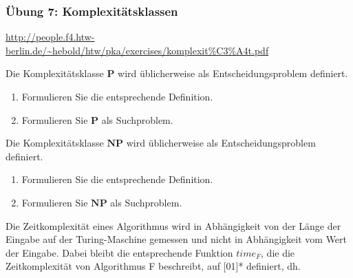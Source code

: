 \begin{card}
	\frametitle{Übung 7: Komplexitätsklassen}
	\url{http://people.f4.htw-berlin.de/~hebold/htw/pka/exercises/komplexit\%C3\%A4t.pdf}
\end{card}

\begin{card}
	Die Komplexitätsklasse $\mathbf{P}$ wird üblicherweise als Entscheidungsproblem definiert.
	\begin{enumerate}
	\item Formulieren Sie die entsprechende Definition.
	\item Formulieren Sie $\mathbf{P}$ als Suchproblem. 
	\end{enumerate}
	\hr
\end{card}

\begin{card}
	Die Komplexitätsklasse $\mathbf{NP}$ wird üblicherweise als Entscheidungsproblem definiert.
	\begin{enumerate}
	\item Formulieren Sie die entsprechende Definition.
	\item Formulieren Sie $\mathbf{NP}$ als Suchproblem. 
	\end{enumerate}
	\hr
\end{card}

\begin{card}
	Die Zeitkomplexität eines Algorithmus wird in Abhängigkeit von der Länge der Eingabe auf	der Turing-Maschine gemessen und nicht in Abhängigkeit vom Wert der Eingabe. Dabei bleibt die entsprechende Funktion $time_F$, die die Zeitkomplexität von Algorithmus F beschreibt, auf [01]* definiert, dh. 
	
	\hr
\end{card}